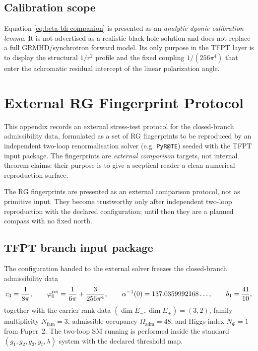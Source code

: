 \documentclass[11pt,a4paper]{article}
\begin{document}
\subsection{Calibration scope}

\begin{remark}
Equation \eqref{eq:beta-bh-companion} is presented as an \emph{analytic dyonic calibration
lemma}. It is not advertised as a realistic black-hole solution and does not replace a full
GRMHD/synchrotron forward model. Its only purpose in the TFPT layer is to display the structural
$1/r^2$ profile and the fixed coupling $1/(256\pi^4)$ that enter the achromatic residual
intercept of the linear polarization angle.
\end{remark}


\clearpage
\section{External RG Fingerprint Protocol}
\label{app:rg-fingerprints}

This appendix records an external stress-test protocol for the closed-branch admissibility data,
formulated as a set of RG fingerprints to be reproduced by an independent two-loop renormalisation
solver (e.g. \texttt{PyR@TE}) seeded with the TFPT input package. The fingerprints are
\emph{external comparison} targets, not internal theorem claims: their purpose is to give a
sceptical reader a clean numerical reproduction surface.

\begin{tfptwarningbox}
The RG fingerprints are presented as an external comparison protocol, not as primitive input.
They become trustworthy only after independent two-loop reproduction with the declared
configuration; until then they are a planned compass with no fixed north.
\end{tfptwarningbox}

\subsection{TFPT branch input package}

The configuration handed to the external solver freezes the closed-branch admissibility data
\[
c_3=\frac{1}{8\pi},\qquad
\varphi_0^{\mathrm{ret}}=\frac{1}{6\pi}+\frac{3}{256\pi^4},\qquad
\alpha^{-1}(0)=137.0359992168\ldots,\qquad
b_1=\frac{41}{10},
\]
together with the carrier rank data $(\dim E_-, \dim E_+)=(3,2)$, family multiplicity
$N_{\mathrm{fam}}=3$, admissible occupancy $\Omega_{\mathrm{adm}}=48$, and Higgs index $N_\Phi=1$
from Paper~2. The two-loop SM running is performed inside the standard
$(g_1,g_2,g_3,y_t,\lambda)$ system with the declared threshold map.
\end{document}
